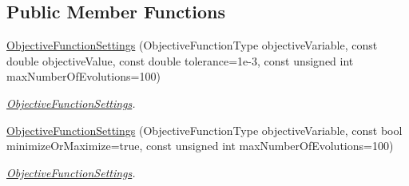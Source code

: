 \subsection*{Public Member Functions}
\begin{DoxyCompactItemize}
\item 
\hyperlink{structtudat_1_1optimization_1_1ObjectiveFunctionSettings_a554e9d53c58455c1cb735a352d311397}{Objective\+Function\+Settings} (Objective\+Function\+Type objective\+Variable, const double objective\+Value, const double tolerance=1e-\/3, const unsigned int max\+Number\+Of\+Evolutions=100)
\begin{DoxyCompactList}\small\item\em \hyperlink{structtudat_1_1optimization_1_1ObjectiveFunctionSettings}{Objective\+Function\+Settings}. \end{DoxyCompactList}\item 
\hyperlink{structtudat_1_1optimization_1_1ObjectiveFunctionSettings_a68ec4b9ffdaae74eee5b55909cd0547b}{Objective\+Function\+Settings} (Objective\+Function\+Type objective\+Variable, const bool minimize\+Or\+Maximize=true, const unsigned int max\+Number\+Of\+Evolutions=100)
\begin{DoxyCompactList}\small\item\em \hyperlink{structtudat_1_1optimization_1_1ObjectiveFunctionSettings}{Objective\+Function\+Settings}. \end{DoxyCompactList}\end{DoxyCompactItemize}
